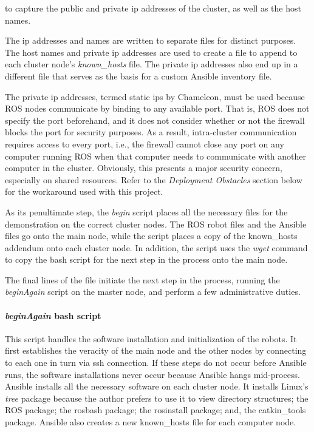 \documentclass[9pt,twocolumn,twoside]{../../styles/osajnl}
\begin{document}
to capture the public and private ip addresses of the cluster, as well as the host names.  

The ip addresses and names are written to separate files for distinct purposes.  The host names and private ip addresses are used to create a file to append to each cluster node's \textit{known\_hosts} file.  The private ip addresses also end up in a different file that serves as the basis for a custom Ansible inventory file.  

The private ip addresses, termed static ips by Chameleon, must be used because ROS nodes communicate by binding to any available port.  That is, ROS does not specify the port beforehand, and it does not consider whether or not the firewall blocks the port for security purposes.  As a result, intra-cluster communication requires access to every port, i.e., the firewall cannot close any port on any computer running ROS when that computer needs to communicate with another computer in the cluster.  Obviously, this presents a major security concern, especially on shared resources. Refer to the \textit{Deployment Obstacles} section below for the workaround used with this project.

As its penultimate step, the \textit{begin} script places all the necessary files for the demonstration on the correct cluster nodes.  The ROS robot files and the Ansible files go onto the main node, while the script places a copy of the known\_hosts addendum onto each cluster node.  In addition, the script uses the \textit{wget} command to copy the bash script for the next step in the process onto the main node.

The final lines of the file initiate the next step in the process, running the \textit{beginAgain} script on the master node, and perform a few administrative duties.

\paragraph{\textit{beginAgain} bash script}
This script handles the software installation and initialization of the robots.  It first establishes the veracity of the main node and the other nodes by connecting to each one in turn via ssh connection.  If these steps do not occur before Ansible runs, the software installations never occur because Ansible hangs mid-process.  Ansible installs all the necessary software on each cluster node.  It installs Linux's \textit{tree} package because the author prefers to use it to view directory structures; the ROS package; the rosbash package; the rosinstall package; and, the catkin\_tools package. Ansible also creates a new known\_hosts file for each computer node.
\end{document}
